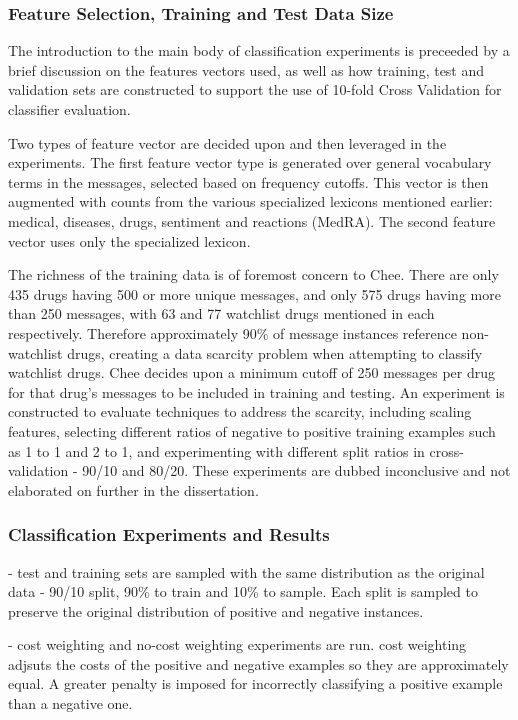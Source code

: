 \documentclass[twoside,11pt]{article}
\begin{document}
\subsubsection{Feature Selection, Training and Test Data Size}
The introduction to the main body of classification experiments is preceeded by a brief discussion on the features vectors used, as well as how training, test and validation sets are constructed to support the use of 10-fold Cross Validation for classifier evaluation.

Two types of feature vector are decided upon and then leveraged in the  experiments. The first feature vector type is generated over general vocabulary terms in the messages, selected based on frequency cutoffs. This vector is then augmented with counts from the various specialized lexicons mentioned earlier: medical, diseases, drugs, sentiment and reactions (MedRA). The second feature vector uses only the specialized lexicon.

The richness of the training data is of foremost concern to Chee. There are only 435 drugs having 500 or more unique messages, and only 575 drugs having more than 250 messages, with 63 and 77 watchlist drugs mentioned in each respectively. Therefore approximately 90\% of message instances reference non-watchlist drugs, creating a data scarcity problem when attempting to classify watchlist drugs. Chee decides upon a minimum cutoff of 250 messages per drug for that drug's messages to be included in training and testing. An  experiment is constructed to evaluate techniques to address the scarcity, including scaling features, selecting different ratios of negative to positive training examples such as 1 to 1 and 2 to 1, and experimenting with different split ratios in cross-validation - 90/10 and 80/20. These experiments are dubbed inconclusive and not elaborated on further in the dissertation.

\subsubsection{Classification Experiments and Results}
- test and training sets are sampled with the same distribution as the original data
- 90/10 split, 90\% to train and 10\% to sample.  Each split is sampled to preserve the original distribution of positive and negative instances.

- cost weighting and no-cost weighting experiments are run.  cost weighting adjsuts the costs of the positive and negative examples so they are approximately equal.  A greater penalty is imposed for incorrectly classifying a positive example than a negative one.
\end{document}
